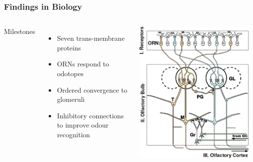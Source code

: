 \documentclass{beamer}
\newcommand{\mancite}[1]{{\scriptsize{\textbf{\color{MainGreen}{[#1] }}}}}
\begin{document}
\begin{frame}
\frametitle{Findings in Biology}
\begin{columns}
Milestones
\begin{itemize}
  \item Seven trans-membrane proteins %
  \mancite{Axel and Buck, 1991, Nobel Prize}
  \item ORNs respond to odotopes %
  \mancite{Shepherd, 1987, 1994}
  \item Ordered convergence to glomeruli %
  \mancite{Vassar, 1994}
  \item Inhibitory connections to improve odour recognition %
  \mancite{Wilson, 2004}
\end{itemize}
\includegraphics[width=1.0\linewidth]{images/olf-pathway-scheme.png}
\end{columns}
\end{frame}
\end{document}
